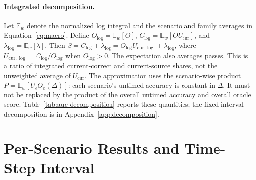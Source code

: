 \paragraph{Integrated decomposition.}
\label{app:auc-decomposition}
Let $\mathbb{E}_w$ denote the normalized log integral and the scenario and family averages in Equation~\eqref{eq:macro}.
Define $O_{\log}=\mathbb{E}_w[O]$, $C_{\log}=\mathbb{E}_w[O U_{\mathrm{cur}}]$, and $\lambda_{\log}=\mathbb{E}_w[\lambda]$.
Then $S=C_{\log}+\lambda_{\log}=O_{\log}U_{\mathrm{cur},\log}+\lambda_{\log}$, where $U_{\mathrm{cur},\log}=C_{\log}/O_{\log}$ when $O_{\log}>0$.
The expectation also averages passes. This is a ratio of integrated current-correct and current-source shares, not the unweighted average of $U_{\mathrm{cur}}$.
The approximation uses the scenario-wise product $P=\mathbb{E}_w[U_e O_e(\Delta)]$: each scenario's untimed accuracy is constant in $\Delta$.
It must not be replaced by the product of the overall untimed accuracy and overall oracle score.
Table~\ref{tab:auc-decomposition} reports these quantities; the fixed-interval decomposition is in Appendix~\ref{app:decomposition}.

\FloatBarrier
\section{Per-Scenario Results and Time-Step Interval}
\label{app:scenario}

